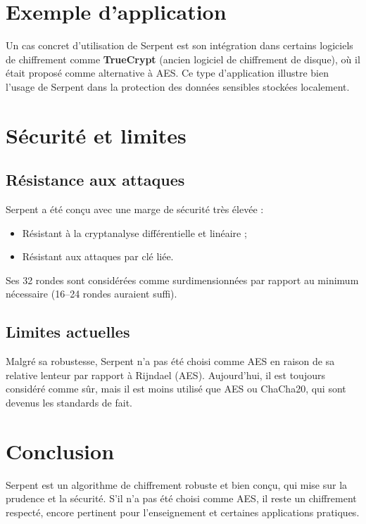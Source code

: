 \documentclass[12pt,a4paper]{report}
\begin{document}
\section*{Exemple d’application}

Un cas concret d’utilisation de Serpent est son intégration dans certains logiciels de chiffrement comme \textbf{TrueCrypt} (ancien logiciel de chiffrement de disque), où il était proposé comme alternative à AES.  
Ce type d’application illustre bien l’usage de Serpent dans la protection des données sensibles stockées localement.

\section*{Sécurité et limites}

\setcounter{subsection}{0}

\subsection{Résistance aux attaques}
Serpent a été conçu avec une marge de sécurité très élevée :
\begin{itemize}
    \item Résistant à la cryptanalyse différentielle et linéaire ;
    \item Résistant aux attaques par clé liée.
\end{itemize}
Ses 32 rondes sont considérées comme surdimensionnées par rapport au minimum nécessaire (16–24 rondes auraient suffi).

\subsection{Limites actuelles}

Malgré sa robustesse, Serpent n’a pas été choisi comme AES en raison de sa relative lenteur par rapport à Rijndael (AES).  
Aujourd’hui, il est toujours considéré comme sûr, mais il est moins utilisé que AES ou ChaCha20, qui sont devenus les standards de fait.

\section*{Conclusion}

Serpent est un algorithme de chiffrement robuste et bien conçu, qui mise sur la prudence et la sécurité.  
S’il n’a pas été choisi comme AES, il reste un chiffrement respecté, encore pertinent pour l’enseignement et certaines applications pratiques.
\end{document}
